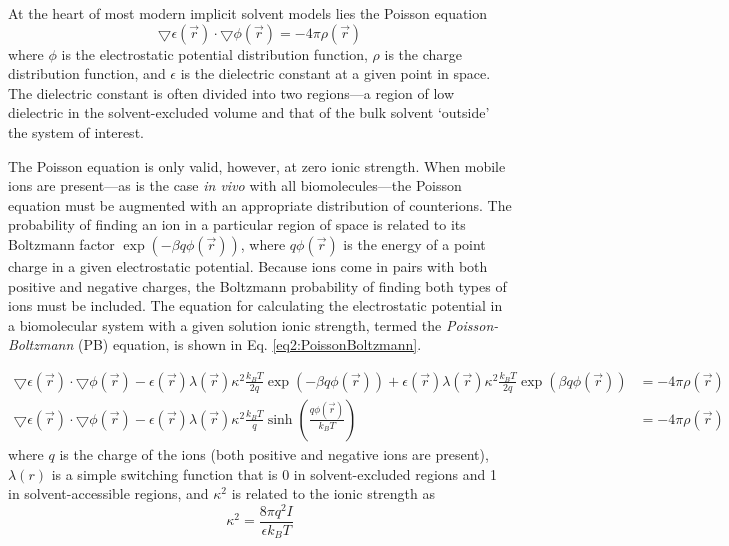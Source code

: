 At the heart of most modern implicit solvent models lies the Poisson equation
\begin{equation*}
   \bigtriangledown \epsilon(\vec{r}) \cdot \bigtriangledown \phi ( \vec{r} ) =
            -4 \pi \rho(\vec{r})
\end{equation*}
where $\phi$ is the electrostatic potential distribution function, $\rho$ is
the charge distribution function, and $\epsilon$ is the dielectric constant at a
given point in space. The dielectric constant is often divided into two
regions---a region of low dielectric in the solvent-excluded volume and that of
the bulk solvent `outside' the system of interest.
\cite{Cramer_Book_EssentialsCompChem_2004}

The Poisson equation is only valid, however, at zero ionic strength. When mobile
ions are present---as is the case \emph{in vivo} with all biomolecules---the
Poisson equation must be augmented with an appropriate distribution of
counterions. The probability of finding an ion in a particular region of space
is related to its Boltzmann factor $\exp (-\beta q \phi(\vec{r}))$, where $q
\phi(\vec{r})$ is the energy of a point charge in a given electrostatic
potential. Because ions come in pairs with both positive and negative charges,
the Boltzmann probability of finding both types of ions must be included. The
equation for calculating the electrostatic potential in a biomolecular system
with a given solution ionic strength, termed the \emph{Poisson-Boltzmann} (PB)
equation, is shown in Eq. \ref{eq2:PoissonBoltzmann}.
\cite{Cramer_Book_EssentialsCompChem_2004}

\begin{align}
   \bigtriangledown \epsilon(\vec{r}) \cdot \bigtriangledown \phi(\vec{r}) -
      \epsilon(\vec{r}) \lambda(\vec{r}) \kappa^2 \frac{k_B T} {2 q} \exp \left
      ( -\beta q \phi(\vec{r}) \right ) + \epsilon(\vec{r}) \lambda(\vec{r})
      \kappa^2 \frac{k_B T} {2 q}  \exp \left ( \beta q \phi(\vec{r})
      \right ) & = -4 \pi \rho (\vec{r}) \nonumber \\ \bigtriangledown
      \epsilon(\vec{r}) \cdot \bigtriangledown \phi(\vec{r}) - \epsilon(\vec{r})
      \lambda(\vec{r}) \kappa^2 \frac{k_B T} q \sinh \left ( \frac {q
      \phi(\vec{r})} {k_B T} \right ) & = -4 \pi \rho (\vec{r})
   \label{eq2:PoissonBoltzmann}
\end{align}
where $q$ is the charge of the ions (both positive and negative ions are
present), $\lambda(r)$ is a simple switching function that is 0 in
solvent-excluded regions and 1 in solvent-accessible regions, and $\kappa^2$ is
related to the ionic strength as
\begin{equation*}
   \kappa ^ 2 = \frac {8 \pi q ^ 2 I} {\epsilon k_B T}
\end{equation*}

